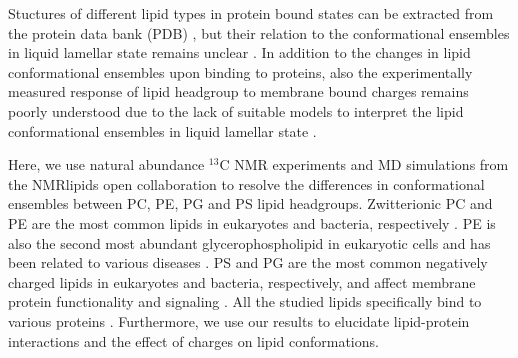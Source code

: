 \documentclass[aps,prl,superscriptaddress,twocolumn]{revtex4}
\begin{document}
Stuctures of different lipid types in protein bound states can be extracted from the protein data bank (PDB) \cite{berman00},
but their relation to the conformational ensembles in liquid lamellar state remains unclear \cite{marsh13b}.
In addition to the changes in lipid conformational ensembles upon binding to proteins,
also the experimentally measured response of lipid headgroup to membrane bound charges remains poorly understood 
due to the lack of suitable models to interpret the lipid conformational ensembles in liquid lamellar state \cite{Semchyschyn04}.


Here, we use natural abundance $^{13}$C NMR experiments and MD simulations from the NMRlipids open collaboration
to resolve the differences in conformational ensembles between PC, PE, PG and PS lipid headgroups.
Zwitterionic PC and PE are the most common lipids in eukaryotes and bacteria, respectively \cite{vanmeer08,sohlenkamp16}.
PE is also the second most abundant glycerophospholipid in eukaryotic cells
and has been related to various diseases \cite{vance15,calzada16,patel17}.
PS and PG are the most common negatively charged lipids in eukaryotes and bacteria, respectively,
and affect membrane protein functionality and signaling \cite{lemmon08,leventis10,sohlenkamp16,hariharan18}.
All the studied lipids specifically bind to various proteins \cite{yeagle14}.
Furthermore, we use our results to elucidate lipid-protein interactions and the effect of charges on lipid conformations.
\end{document}
